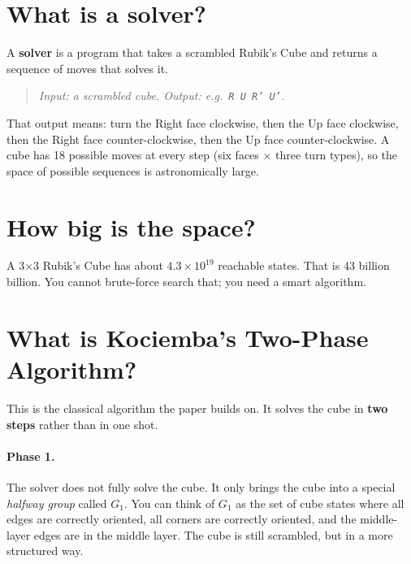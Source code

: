 \documentclass[11pt,a4paper]{article}
\newcommand{\defn}[1]{\textbf{#1}}
\newcommand{\qbox}[1]{\begin{quote}\small\textit{#1}\end{quote}}
\begin{document}
\section{What is a solver?}

A \defn{solver} is a program that takes a scrambled Rubik's Cube and
returns a sequence of moves that solves it.

\qbox{Input: a scrambled cube. \quad Output: e.g.\ \texttt{R U R' U'}.}

That output means: turn the Right face clockwise, then the Up face
clockwise, then the Right face counter-clockwise, then the Up face
counter-clockwise. A cube has 18 possible moves at every step (six faces
$\times$ three turn types), so the space of possible sequences is
astronomically large.

\section{How big is the space?}

A 3$\times$3 Rubik's Cube has about $4.3 \times 10^{19}$ reachable
states. That is 43 billion billion. You cannot brute-force search that;
you need a smart algorithm.

\section{What is Kociemba's Two-Phase Algorithm?}

This is the classical algorithm the paper builds on. It solves the cube
in \textbf{two steps} rather than in one shot.

\paragraph{Phase 1.} The solver does not fully solve the cube. It only
brings the cube into a special \emph{halfway group} called $G_1$. You
can think of $G_1$ as the set of cube states where all edges are
correctly oriented, all corners are correctly oriented, and the
middle-layer edges are in the middle layer. The cube is still
scrambled, but in a more structured way.
\end{document}
